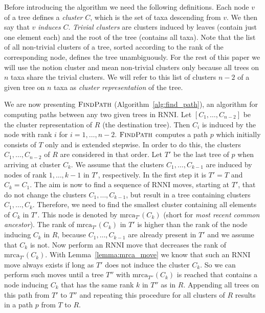 \documentclass{amsart}
\newcommand{\mrca}{\mathrm{mrca}}
\newcommand{\rnni}{\mathrm{RNNI}}
\newcommand{\findpath}{\textsc{FindPath}}
\begin{document}
Before introducing the algorithm we need the following definitions.
Each node $v$ of a tree defines a \emph{cluster} $C$, which is the set of taxa descending from $v$.
We then say that $v$ \emph{induces} $C$.
\emph{Trivial clusters} are clusters induced by leaves (contain just one element each) and the root of the tree (contains all taxa).
Note that the list of all non-trivial clusters of a tree, sorted according to the rank of the corresponding node, defines the tree unambiguously.
For the rest of this paper we will use the notion cluster and mean non-trivial clusters only because all trees on $n$ taxa share the trivial clusters.
We will refer to this list of clusters $n-2$ of a given tree on $n$ taxa as \emph{cluster representation} of the tree.

We are now presenting $\findpath$ (Algorithm~\ref{alg:find_path}), an algorithm for computing paths between any two given trees in $\rnni$.
Let $[C_1, \ldots, C_{n-2}]$ be the cluster representation of $R$ (the destination tree).
Then $C_i$ is induced by the node with rank $i$ for $i = 1, \ldots, n-2$.
$\findpath$ computes a path $p$ which initially consists of $T$ only and is extended stepwise.
In order to do this, the clusters $C_1, \ldots, C_{n-2}$ of $R$ are considered in that order.
Let $T'$ be the last tree of $p$ when arriving at cluster $C_k$.
We assume that the clusters $C_1, \ldots, C_{k-1}$ are induced by nodes of rank $1, \ldots, k-1$ in $T'$, respectively.
In the first step it is $T' = T$ and $C_k = C_1$.
The aim is now to find a sequence of $\rnni$ moves, starting at $T'$, that do not change the clusters $C_1, \ldots, C_{k-1}$, but result in a tree containing clusters $C_1, \ldots, C_{k}$.
Therefore, we need to find the smallest cluster containing all elements of $C_k$ in $T'$.
This node is denoted by $\mrca_{T'}(C_k)$ (short for \emph{most recent common ancestor}).
The rank of $\mrca_{T'}(C_k)$ in $T'$ is higher than the rank of the node inducing $C_k$ in $R$, because $C_1, \ldots, C_{k-1}$ are already present in $T'$ and we assume that $C_k$ is not.
Now perform an $\rnni$ move that decreases the rank of $\mrca_{T'}(C_k)$.
With Lemma~\ref{lemma:mrca_move} we know that such an $\rnni$ move always exists if long as $T'$ does not induce the cluster $C_k$.
So we can perform such moves until a tree $T''$ with $\mrca_{T''}(C_k)$ is reached that contains a node inducing $C_k$ that has the same rank $k$ in $T''$ as in $R$.
Appending all trees on this path from $T'$ to $T''$ and repeating this procedure for all clusters of $R$ results in a path $p$ from $T$ to $R$.
\end{document}
